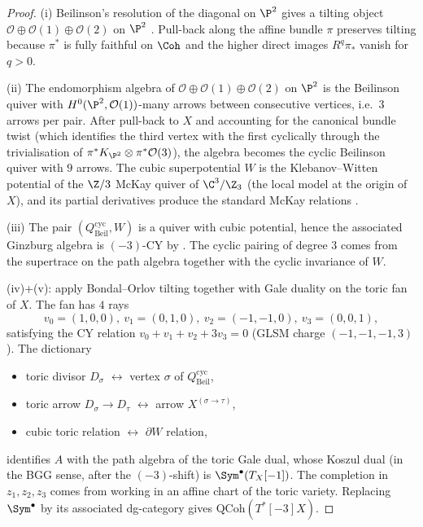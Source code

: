 \begin{proof}
(i) Beilinson's resolution of the diagonal on $\P^2$ gives a tilting object $\mathcal{O}\oplus\mathcal{O}(1)\oplus\mathcal{O}(2)$ on $\P^2$ \cite{Beilinson1978}. Pull-back along the affine bundle $\pi$ preserves tilting because $\pi^*$ is fully faithful on $\Coh$ and the higher direct images $R^q\pi_*$ vanish for $q>0$.

(ii) The endomorphism algebra of $\mathcal{O}\oplus\mathcal{O}(1)\oplus\mathcal{O}(2)$ on $\P^2$ is the Beilinson quiver with $H^0(\P^2,\mathcal{O}(1))$-many arrows between consecutive vertices, i.e.\ $3$ arrows per pair. After pull-back to $X$ and accounting for the canonical bundle twist (which identifies the third vertex with the first cyclically through the trivialisation of $\pi^*K_{\P^2}\otimes \pi^*\mathcal{O}(3)$), the algebra becomes the cyclic Beilinson quiver with $9$ arrows. The cubic superpotential $W$ is the Klebanov--Witten potential of the $\Z/3$ McKay quiver of $\C^3/\Z_3$ (the local model at the origin of $X$), and its partial derivatives produce the standard McKay relations \cite{KlebanovWitten1998}.

(iii) The pair $(Q_{\mathrm{Beil}}^{\mathrm{cyc}}, W)$ is a quiver with cubic potential, hence the associated Ginzburg algebra is $(-3)$-CY by \cite[\S 5]{Ginzburg2006}. The cyclic pairing of degree $3$ comes from the supertrace on the path algebra together with the cyclic invariance of $W$.

(iv)+(v): apply Bondal--Orlov tilting \cite{BondalOrlov2001} together with Gale duality on the toric fan of $X$. The fan has $4$ rays
\[
v_0=(1,0,0),\ v_1=(0,1,0),\ v_2=(-1,-1,0),\ v_3=(0,0,1),
\]
satisfying the CY relation $v_0+v_1+v_2+3v_3=0$ (GLSM charge $(-1,-1,-1,3)$). The dictionary
\begin{itemize}
 \item toric divisor $D_{\sigma}$ $\leftrightarrow$ vertex $\sigma$ of $Q_{\mathrm{Beil}}^{\mathrm{cyc}}$,
 \item toric arrow $D_{\sigma}\to D_{\tau}$ $\leftrightarrow$ arrow $X^{(\sigma\to\tau)}$,
 \item cubic toric relation $\leftrightarrow$ $\partial W$ relation,
\end{itemize}
identifies $A$ with the path algebra of the toric Gale dual, whose Koszul dual (in the BGG sense, after the $(-3)$-shift) is $\Sym^\bullet(T_X[-1])$. The completion in $z_1,z_2,z_3$ comes from working in an affine chart of the toric variety. Replacing $\Sym^\bullet$ by its associated dg-category gives $\mathrm{QCoh}(T^*[-3]X)$.


\end{proof}
